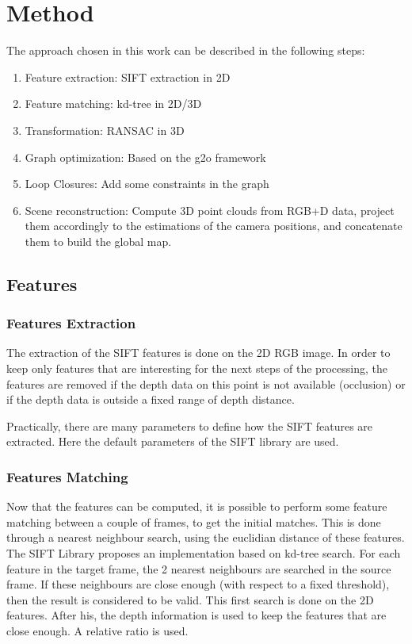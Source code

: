\chapter{Method}

The approach chosen in this work can be described in the following steps:
\begin{enumerate}
\item Feature extraction: SIFT extraction in 2D
\item Feature matching: kd-tree in 2D/3D
\item Transformation: RANSAC in 3D
\item Graph optimization: Based on the g2o framework
\item Loop Closures: Add some constraints in the graph
\item Scene reconstruction: Compute 3D point clouds from RGB+D data, project them accordingly to the estimations of the camera positions, and concatenate them to build the global map.
\end{enumerate}

\section{Features}
\subsection{Features Extraction}

The extraction of the SIFT features is done on the 2D RGB image. In order to keep only features that are interesting for the next steps of the processing, the features are removed if the depth data on this point is not available (occlusion) or if the depth data is outside a fixed range of depth distance.

Practically, there are many parameters to define how the SIFT features are extracted. Here the default parameters of the SIFT library are used.

\subsection{Features Matching}

Now that the features can be computed, it is possible to perform some feature matching between a couple of frames, to get the initial matches. This is done through a nearest neighbour search, using the euclidian distance of these features.  
The SIFT Library proposes an implementation based on kd-tree search. For each feature in the target frame, the 2 nearest neighbours are searched in the source frame. If these neighbours are close enough (with respect to a fixed threshold), then the result is considered to be valid. This first search is done on the 2D features.
After his, the depth information is used to keep the features that are close enough. A relative ratio is used.

